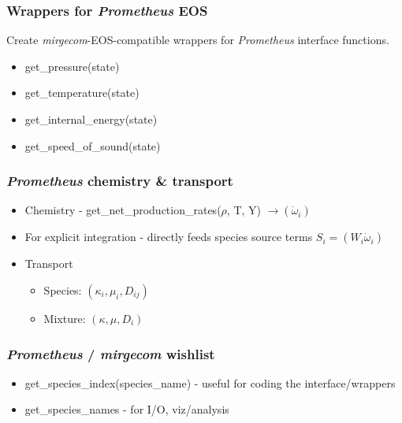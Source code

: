 \begin{frame}\frametitle{Wrappers for \textit{Prometheus} EOS}
Create \textit{mirgecom}-EOS-compatible wrappers for \textit{Prometheus} interface functions.
\begin{itemize}
\item get\_pressure(state)
\item get\_temperature(state)
\item get\_internal\_energy(state)
\item get\_speed\_of\_sound(state)
\end{itemize}
\end{frame}

\begin{frame}\frametitle{\textit{Prometheus} chemistry \& transport}
\begin{itemize}
\item Chemistry - get\_net\_production\_rates($\rho$, T, Y) $\rightarrow (\dot{\omega}_i)$
\item For explicit integration - directly feeds species source terms $S_i = (W_i \dot{\omega}_i)$
\item Transport
   \begin{itemize}
      \item Species:  $(\kappa_i, \mu_i, D_{ij})$
      \item Mixture: $(\kappa, \mu, D_i)$
   \end{itemize}
\end{itemize}
\end{frame}

\begin{frame}\frametitle{\textit{Prometheus} / \textit{mirgecom} wishlist}
\begin{itemize}
   \item get\_species\_index(species\_name) - useful for coding the interface/wrappers
   \item get\_species\_names - for I/O, viz/analysis
\end{itemize}           
\end{frame}

